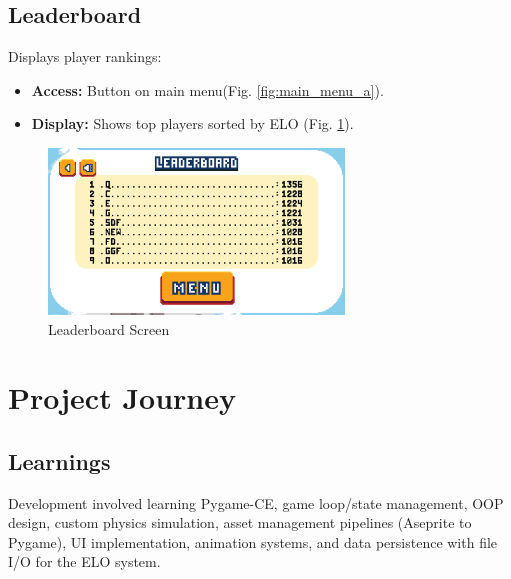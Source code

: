 \documentclass[11pt, a4paper]{article}
\begin{document}
\newpage

\subsection{Leaderboard}

Displays player rankings:

\begin{itemize}

    \item \textbf{Access:} Button on main menu(Fig. \ref{fig:main_menu_a}).
    
    \item \textbf{Display:} Shows top players sorted by ELO (Fig. \ref{fig:leaderboard_a}).

\end{itemize}

\begin{figure}[h!]

    \centering
    
    \includegraphics[width=0.7\textwidth]{images/leaderboard.png}
    
    \caption{Leaderboard Screen}
    
    \label{fig:leaderboard_a}

\end{figure}

\newpage

\section{Project Journey}

\subsection{Learnings}

Development involved learning Pygame-CE, game loop/state management, OOP design, custom physics simulation, asset management pipelines (Aseprite to Pygame), UI implementation, animation systems, and data persistence with file I/O for the ELO system.
\end{document}
